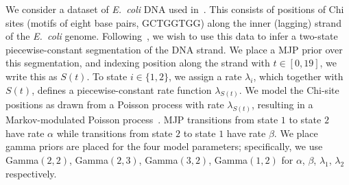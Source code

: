 {\begin{figure}
\begin{minipage}[!hp]{.7\linewidth}
  \end{minipage}
    \vspace{-.3in}
  \end{figure}
  We consider a dataset of {\em E.\ coli} DNA used in~\cite{FearnSher2006}.
  This consists of positions of Chi sites (motifs of eight base pairs, 
  GCTGGTGG) along the inner (lagging) strand of the {\em E.\ coli} genome. 
  Following~\cite{FearnSher2006}, we wish to use this data to infer a 
  two-state piecewise-constant segmentation of the DNA strand. We place a 
  MJP prior over this segmentation, and indexing position along the 
  strand with $t \in [0,19]$, we write this as $S(t)$. To state $i \in 
  \{1,2\}$, we assign a rate $\lambda_i$, which together with $S(t)$, 
  defines a piecewise-constant rate function $\lambda_{S(t)}$. We model 
  the Chi-site positions as drawn from a Poisson process with rate 
  $\lambda_{S(t)}$, resulting in a {Markov-modulated Poisson 
  process}~\cite{scottmmpp03}. 
  MJP transitions from state $1$ to state $2$ have rate $\alpha$ while 
  transitions from state $2$ to state $1$ have rate $\beta$. We place 
  gamma priors are placed for the four model parameters; specifically, 
  we use Gamma$(2,2)$, Gamma$(2,3)$, Gamma$(3,2)$, Gamma$(1,2)$ for 
  $\alpha$, $\beta$, $\lambda_1$, $\lambda_2$ respectively.

}
